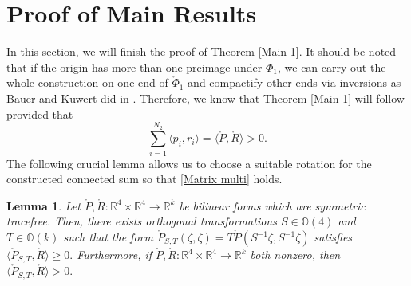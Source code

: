 \documentclass[11pt,letterpaper]{amsart}
\newtheorem{lemma}[theorem]{Lemma}
\theoremstyle{definition}
\theoremstyle{remark}
\numberwithin{equation}{section}
\begin{document}
\section{Proof of Main Results}\label{Conclusion}
In this section, we will finish the proof of Theorem \ref{Main 1}. It should be noted that if the origin has more than one preimage under $\Phi_1$, we can carry out the whole construction on one end of $\mathring{\Phi}_1$ and compactify other ends via inversions as Bauer and Kuwert did in \cite{Bauer-Kuwert03}. Therefore, we know that Theorem \ref{Main 1} will follow provided that 
\begin{equation}\label{Matrix multi}
   \sum_{i=1}^{N_2}\langle p_i, r_i\rangle= \langle \mathring{P}, \mathring{R} \rangle > 0.
\end{equation}
The following crucial lemma allows us to choose a suitable rotation for the constructed connected sum so that \ref{Matrix multi} holds.
\begin{lemma}
    Let $\mathring{P}, \mathring{R}: \mathbb{R}^4 \times \mathbb{R}^4 \to \mathbb{R}^k $ be bilinear forms which are symmetric tracefree. Then, there exists orthogonal transformations $S \in \mathbb{O}(4) $ and $T \in \mathbb{O}(k)$ such that the form $\mathring{P}_{S, T}(\zeta, \zeta)=T\mathring{P}(S^{-1} \zeta, S^{-1} \zeta)$ satisfies $\langle \mathring{P}_{S, T}, \mathring{R} \rangle  \geq 0.$ Furthermore, if $\mathring{P}, \mathring{R}: \mathbb{R}^4 \times \mathbb{R}^4 \to \mathbb{R}^k $ both nonzero, then  $\langle \mathring{P}_{S, T}, \mathring{R} \rangle  > 0.$
\end{lemma}
\end{document}
